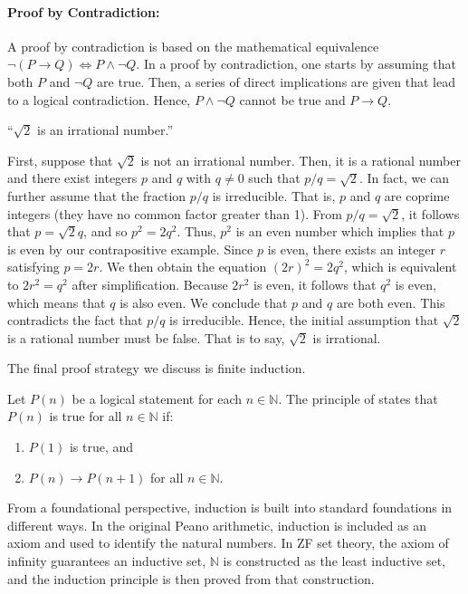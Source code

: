 \paragraph{Proof by Contradiction:}
A proof by contradiction is based on the mathematical equivalence $\neg (P \rightarrow Q) \Leftrightarrow P \wedge \neg Q$.
In a proof by contradiction, one starts by assuming that both $P$ and $\neg Q$ are true.
Then, a series of direct implications are given that lead to a logical contradiction.
Hence, $P \wedge \neg Q$ cannot be true and $P \rightarrow Q$.

\begin{example} \label{example:SquareRoot2}
``$\sqrt{2}$ is an irrational number.''

First, suppose that $\sqrt{2}$ is not an irrational number.
Then, it is a rational number and there exist integers $p$ and $q$ with $q \neq 0$ such that $p/q = \sqrt{2}$.
In fact, we can further assume that the fraction $p/q$ is irreducible.
That is, $p$ and $q$ are coprime integers (they have no common factor greater than 1).
From $p/q = \sqrt{2}$, it follows that $p = \sqrt{2} q$, and so $p^2 = 2 q^2$.
Thus, $p^2$ is an even number which implies that $p$ is even by our contrapositive example.
Since $p$ is even, there exists an integer $r$ satisfying $p = 2r$.
We then obtain the equation $(2r)^2 = 2q^2$, which is equivalent to $2r^2 = q^2$ after simplification.
Because $2r^2$ is even, it follows that $q^2$ is even, which means that $q$ is also even.
We conclude that $p$ and $q$ are both even.
This contradicts the fact that $p/q$ is irreducible.
Hence, the initial assumption that $\sqrt{2}$ is a rational number must be false.
That is to say, $\sqrt{2}$ is irrational.
\end{example}

The final proof strategy we discuss is finite induction.

\begin{definition}
Let $P(n)$ be a logical statement for each $n\in \mathbb{N}$.
The principle of  states that $P(n)$ is true for all $n\in \mathbb{N}$ if:

\begin{enumerate}
\item $P(1)$ is true, and
\item $P(n)\to P(n+1)$ for all $n\in \mathbb{N}$.
\end{enumerate}
\end{definition}

From a foundational perspective, induction is built into standard foundations in different ways.
In the original Peano arithmetic, induction is included as an axiom and used to identify the natural numbers.
In ZF set theory, the axiom of infinity guarantees an inductive set, $\mathbb N$ is constructed as the least inductive set, and the induction principle is then proved from that construction.

